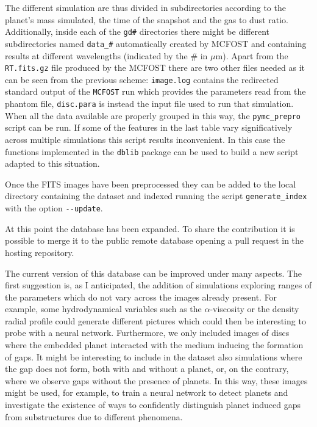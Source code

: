 \documentclass[a4paper,10pt]{report}
\begin{document}
The different simulation are thus divided in subdirectories according to the planet's mass simulated, the time of the
snapshot and the gas to dust ratio. Additionally, inside each of the \lstinline{gd#} directories 
there might be different subdirectories named \lstinline{data_#} automatically created by MCFOST 
and containing results at different wavelengths (indicated by the \# in $\mu$m).
Apart from the \lstinline{RT.fits.gz} file produced by the MCFOST there are two other files needed as it can be seen
from the previous scheme: \lstinline{image.log} contains the redirected standard output of the \lstinline{MCFOST} run which 
provides the parameters read from the phantom file,
\lstinline{disc.para} is instead the input file used to run that simulation.
When all the data available are properly grouped in this way, the \lstinline{pymc_prepro} script
can be run. If some of the features in the last table vary significatively across multiple simulations this script 
results inconvenient. In this case the functions implemented in the \lstinline{dblib} package can be used
to build a new script adapted to
this situation.

Once the FITS images have been preprocessed they can be added to the local directory containing the dataset 
and indexed running the script \lstinline{generate_index} with the option \lstinline{--update}. 

At this point the database has been expanded. To share the contribution it is possible to merge it to the public remote database
opening a pull request in the hosting repository. 

The current version of this database can be improved under many aspects. The first suggestion
is, as I anticipated, the addition of simulations exploring ranges of the parameters which do not vary across the images already present.
For example, some hydrodynamical variables such as the $\alpha$-viscosity 
or the density radial profile could generate different pictures which could then be interesting to probe with a neural network.
Furthermore, we only included images of discs where the embedded planet interacted with the medium inducing the formation of
gaps. It might be interesting to include in the dataset also simulations where the gap does
not form, both with and without a planet, or, on the contrary, where we observe gaps without the presence of planets.
In this way, these images might be used, for example, to train a neural network to detect planets and investigate
the existence of ways to confidently distinguish planet induced gaps from substructures due to different phenomena. 
\end{document}
